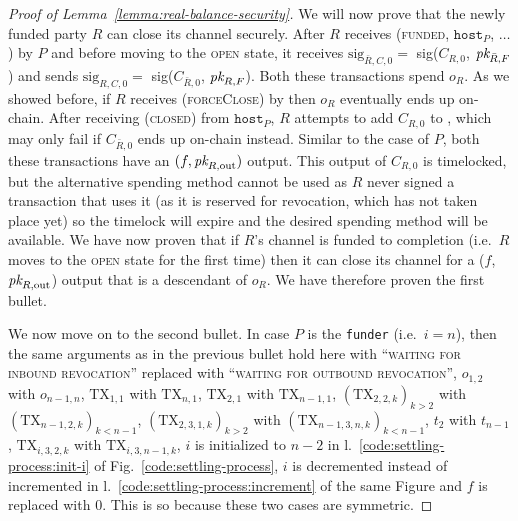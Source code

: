\begin{proof}[Proof of Lemma~\ref{lemma:real-balance-security}]
  We will now prove that the newly funded party $R$ can close its channel
  securely. After $R$ receives (\textsc{funded}, $\texttt{host}_P$, $\dots$) by
  $P$ and before moving to the \textsc{open} state, it receives
  $\mathrm{sig}_{\bar{R}, C, 0} =$ sig($C_{R, 0}$, $\textit{pk}_{\bar{R}, F}$) and sends
  $\mathrm{sig}_{R, C, 0} =$ sig($C_{\bar{R}, 0}$, $\textit{pk}_{R, F}$). Both these
  transactions spend $o_R$. As we showed before, if $R$ receives
  (\textsc{forceClose}) by \environment then $o_R$ eventually ends up on-chain. After
  receiving (\textsc{closed}) from $\texttt{host}_P$, $R$ attempts to add $C_{R,
  0}$ to \ledger, which may only fail if $C_{\bar{R}, 0}$ ends up on-chain
  instead.  Similar to the case of $P$, both these transactions have an $(f,
  \textit{pk}_{R, \mathrm{out}})$ output. This output of $C_{R, 0}$ is timelocked, but
  the alternative spending method cannot be used as $R$ never signed a
  transaction that uses it (as it is reserved for revocation, which has not
  taken place yet) so the timelock will expire and the desired spending method
  will be available. We have now proven that if $R$'s channel is funded to
  completion (i.e.\ $R$ moves to the \textsc{open} state for the first time) then
  it can close its channel for a ($f$, $\textit{pk}_{R, \mathrm{out}}$) output that is a
  descendant of $o_R$. We have therefore proven the first bullet.

  We now move on to the second bullet. In case $P$ is the \texttt{funder} (i.e.\
  $i=n$), then the same arguments as in the previous bullet hold here with
  ``\textsc{waiting for inbound revocation}'' replaced with ``\textsc{waiting
  for outbound revocation}'', $o_{1, 2}$ with $o_{n-1, n}$, $\mathrm{TX}_{1, 1}$
  with $\mathrm{TX}_{n, 1}$, $\mathrm{TX}_{2, 1}$ with $\mathrm{TX}_{n-1, 1}$,
  $(\mathrm{TX}_{2, 2, k})_{k > 2}$ with $(\mathrm{TX}_{n-1, 2, k})_{k < n-1}$,
  $(\mathrm{TX}_{2, 3, 1, k})_{k > 2}$ with $(\mathrm{TX}_{n-1, 3, n, k})_{k <
  n-1}$, $t_2$ with $t_{n-1}$, $\mathrm{TX}_{i, 3, 2, k}$ with $\mathrm{TX}_{i,
  3, n-1, k}$, $i$ is initialized to $n-2$ in
  l.~\ref{code:settling-process:init-i} of Fig.~\ref{code:settling-process}, $i$
  is decremented instead of incremented in
  l.~\ref{code:settling-process:increment} of the same Figure and $f$ is
  replaced with $0$. This is so because these two cases are symmetric.


\end{proof}

